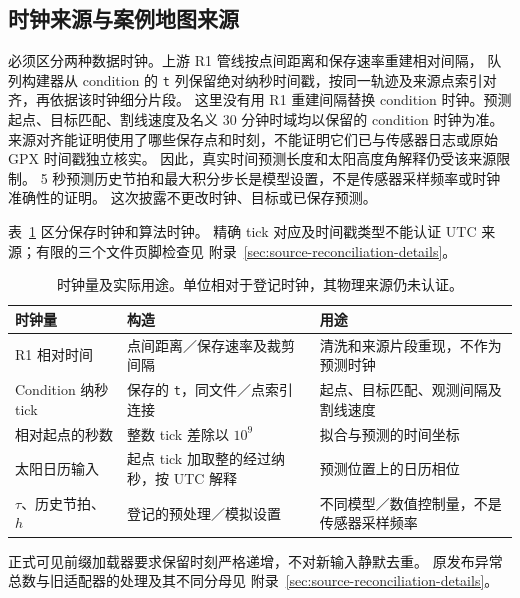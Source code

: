 \documentclass[UTF8,11pt]{ctexart}
\begin{document}
\subsection{时钟来源与案例地图来源}
\label{sec:clock-and-map-provenance}
必须区分两种数据时钟。上游 R1 管线按点间距离和保存速率重建相对间隔，
队列构建器从 condition 的 \texttt{t} 列保留绝对纳秒时间戳，按同一轨迹及来源点索引对齐，再依据该时钟细分片段。
这里没有用 R1 重建间隔替换 condition 时钟。预测起点、目标匹配、割线速度及名义 30 分钟时域均以保留的 condition 时钟为准。
来源对齐能证明使用了哪些保存点和时刻，不能证明它们已与传感器日志或原始 GPX 时间戳独立核实。
因此，真实时间预测长度和太阳高度角解释仍受该来源限制。
5 秒预测历史节拍和最大积分步长是模型设置，不是传感器采样频率或时钟准确性的证明。
这次披露不更改时钟、目标或已保存预测。

表~\ref{tab:clock-use} 区分保存时钟和算法时钟。
精确 tick 对应及时间戳类型不能认证 UTC 来源；有限的三个文件页脚检查见
附录~\ref{sec:source-reconciliation-details}。

\begin{table}[htbp]
\centering\small
\caption{时钟量及实际用途。单位相对于登记时钟，其物理来源仍未认证。}
\label{tab:clock-use}
\begin{tabular}{@{}p{.25\linewidth}p{.36\linewidth}p{.32\linewidth}@{}}
\toprule
时钟量 & 构造 & 用途\\
\midrule
R1 相对时间 & 点间距离／保存速率及裁剪间隔 & 清洗和来源片段重现，不作为预测时钟\\
Condition 纳秒 tick & 保存的 \texttt{t}，同文件／点索引连接 & 起点、目标匹配、观测间隔及割线速度\\
相对起点的秒数 & 整数 tick 差除以 \(10^9\) & 拟合与预测的时间坐标\\
太阳日历输入 & 起点 tick 加取整的经过纳秒，按 UTC 解释 & 预测位置上的日历相位\\
\(\tau\)、历史节拍、\(h\) & 登记的预处理／模拟设置 & 不同模型／数值控制量，不是传感器采样频率\\
\bottomrule
\end{tabular}
\end{table}

正式可见前缀加载器要求保留时刻严格递增，不对新输入静默去重。
原发布异常总数与旧适配器的处理及其不同分母见
附录~\ref{sec:source-reconciliation-details}。
\end{document}
